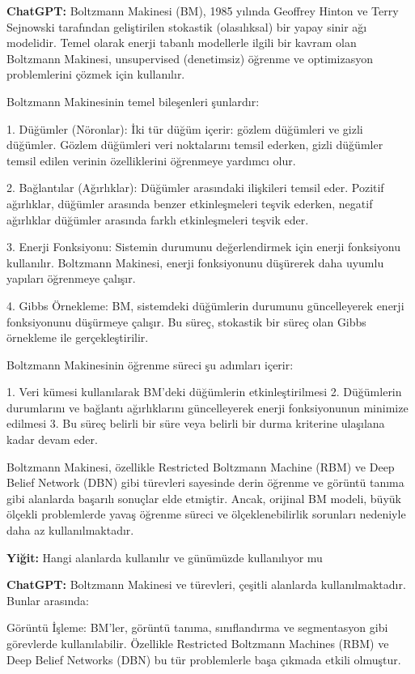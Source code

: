 \documentclass[11pt]{article}
\begin{document}
\textbf{ChatGPT:} Boltzmann Makinesi (BM), 1985 yılında Geoffrey Hinton ve Terry Sejnowski tarafından geliştirilen stokastik (olasılıksal) bir yapay sinir ağı modelidir. Temel olarak enerji tabanlı modellerle ilgili bir kavram olan Boltzmann Makinesi, unsupervised (denetimsiz) öğrenme ve optimizasyon problemlerini çözmek için kullanılır.

Boltzmann Makinesinin temel bileşenleri şunlardır:

1. Düğümler (Nöronlar): İki tür düğüm içerir: gözlem düğümleri ve gizli düğümler. Gözlem düğümleri veri noktalarını temsil ederken, gizli düğümler temsil edilen verinin özelliklerini öğrenmeye yardımcı olur.

2. Bağlantılar (Ağırlıklar): Düğümler arasındaki ilişkileri temsil eder. Pozitif ağırlıklar, düğümler arasında benzer etkinleşmeleri teşvik ederken, negatif ağırlıklar düğümler arasında farklı etkinleşmeleri teşvik eder.

3. Enerji Fonksiyonu: Sistemin durumunu değerlendirmek için enerji fonksiyonu kullanılır. Boltzmann Makinesi, enerji fonksiyonunu düşürerek daha uyumlu yapıları öğrenmeye çalışır.

4. Gibbs Örnekleme: BM, sistemdeki düğümlerin durumunu güncelleyerek enerji fonksiyonunu düşürmeye çalışır. Bu süreç, stokastik bir süreç olan Gibbs örnekleme ile gerçekleştirilir.

Boltzmann Makinesinin öğrenme süreci şu adımları içerir:

1. Veri kümesi kullanılarak BM'deki düğümlerin etkinleştirilmesi
2. Düğümlerin durumlarını ve bağlantı ağırlıklarını güncelleyerek enerji fonksiyonunun minimize edilmesi
3. Bu süreç belirli bir süre veya belirli bir durma kriterine ulaşılana kadar devam eder.

Boltzmann Makinesi, özellikle Restricted Boltzmann Machine (RBM) ve Deep Belief Network (DBN) gibi türevleri sayesinde derin öğrenme ve görüntü tanıma gibi alanlarda başarılı sonuçlar elde etmiştir. Ancak, orijinal BM modeli, büyük ölçekli problemlerde yavaş öğrenme süreci ve ölçeklenebilirlik sorunları nedeniyle daha az kullanılmaktadır.

\textbf{Yiğit:} Hangi alanlarda kullanılır ve günümüzde kullanılıyor mu

\textbf{ChatGPT:} Boltzmann Makinesi ve türevleri, çeşitli alanlarda kullanılmaktadır. Bunlar arasında:

Görüntü İşleme: BM'ler, görüntü tanıma, sınıflandırma ve segmentasyon gibi görevlerde kullanılabilir. Özellikle Restricted Boltzmann Machines (RBM) ve Deep Belief Networks (DBN) bu tür problemlerle başa çıkmada etkili olmuştur.
\end{document}
